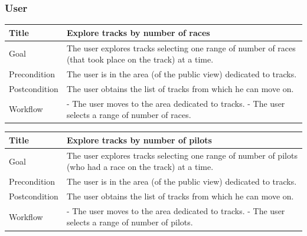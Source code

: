 \documentclass{beamer}
\begin{document}
\begin{frame}
    \frametitle{User}
    \begin{table}
        \tiny
        \begin{tabular}{|p{2cm}|p{6cm}|}
        \hline
        Title & \textbf{Explore tracks by number of races} \\
        \hline
        Goal & The user explores tracks selecting one range of number of races
        (that took place on the track) at a time. \\ 
        \hline
        Precondition & The user is in the area (of the public view) dedicated to tracks.\\
        \hline
        Postcondition & The user obtains the list of tracks from which he can move on.\\
        \hline
        Workflow &
        - The user moves to the area dedicated to tracks. \newline
        - The user selects a range of number of races. \\
        \hline
        \end{tabular}
\end{table}

\begin{table}
    \tiny
    \begin{tabular}{|p{2cm}|p{6cm}|}
    \hline
    Title & \textbf{Explore tracks by number of pilots} \\
    \hline
    Goal & The user explores tracks selecting one range of number of pilots
    (who had a race on the track) at a time. \\
    \hline
    Precondition & The user is in the area (of the public view) dedicated to tracks.\\
    \hline
    Postcondition & The user obtains the list of tracks from which he can move on.\\
    \hline
    Workflow &
    - The user moves to the area dedicated to tracks. \newline
    - The user selects a range of number of pilots. \\
    \hline
    \end{tabular}
\end{table}
\end{frame}


\end{document}
